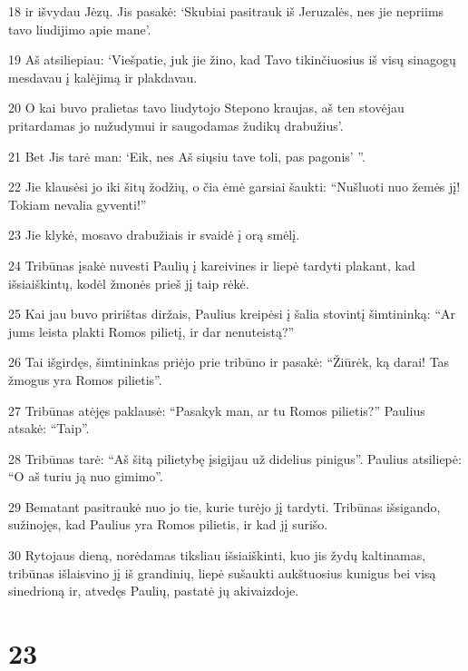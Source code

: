 \par 18 ir išvydau Jėzų. Jis pasakė: ‘Skubiai pasitrauk iš Jeruzalės, nes jie nepriims tavo liudijimo apie mane’. 
\par 19 Aš atsiliepiau: ‘Viešpatie, juk jie žino, kad Tavo tikinčiuosius iš visų sinagogų mesdavau į kalėjimą ir plakdavau. 
\par 20 O kai buvo pralietas tavo liudytojo Stepono kraujas, aš ten stovėjau pritardamas jo nužudymui ir saugodamas žudikų drabužius’. 
\par 21 Bet Jis tarė man: ‘Eik, nes Aš siųsiu tave toli, pas pagonis’ ”. 
\par 22 Jie klausėsi jo iki šitų žodžių, o čia ėmė garsiai šaukti: “Nušluoti nuo žemės jį! Tokiam nevalia gyventi!” 
\par 23 Jie klykė, mosavo drabužiais ir svaidė į orą smėlį. 
\par 24 Tribūnas įsakė nuvesti Paulių į kareivines ir liepė tardyti plakant, kad išsiaiškintų, kodėl žmonės prieš jį taip rėkė. 
\par 25 Kai jau buvo pririštas diržais, Paulius kreipėsi į šalia stovintį šimtininką: “Ar jums leista plakti Romos pilietį, ir dar nenuteistą?” 
\par 26 Tai išgirdęs, šimtininkas priėjo prie tribūno ir pasakė: “Žiūrėk, ką darai! Tas žmogus yra Romos pilietis”. 
\par 27 Tribūnas atėjęs paklausė: “Pasakyk man, ar tu Romos pilietis?” Paulius atsakė: “Taip”. 
\par 28 Tribūnas tarė: “Aš šitą pilietybę įsigijau už didelius pinigus”. Paulius atsiliepė: “O aš turiu ją nuo gimimo”. 
\par 29 Bematant pasitraukė nuo jo tie, kurie turėjo jį tardyti. Tribūnas išsigando, sužinojęs, kad Paulius yra Romos pilietis, ir kad jį surišo. 
\par 30 Rytojaus dieną, norėdamas tiksliau išsiaiškinti, kuo jis žydų kaltinamas, tribūnas išlaisvino jį iš grandinių, liepė sušaukti aukštuosius kunigus bei visą sinedrioną ir, atvedęs Paulių, pastatė jų akivaizdoje.


\chapter{23}


